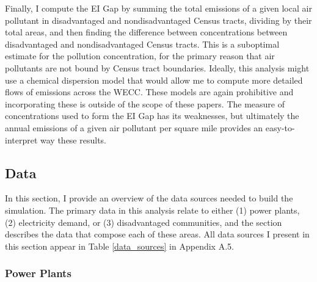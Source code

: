 Finally, I compute the EI Gap by summing the total emissions of a given local air pollutant in disadvantaged and nondisadvantaged Census tracts, dividing by their total areas, and then finding the difference between concentrations between disadvantaged and nondisadvantaged Census tracts. This is a suboptimal estimate for the pollution concentration, for the primary reason that air pollutants are not bound by Census tract boundaries. Ideally, this analysis might use a chemical dispersion model that would allow me to compute more detailed flows of emissions across the WECC. These models are again prohibitive and incorporating these is outside of the scope of these papers. The measure of concentrations used to form the EI Gap has its weaknesses, but ultimately the annual emissions of a given air pollutant per square mile provides an easy-to-interpret way these results. 


\subsection{Data}

In this section, I provide an overview of the data sources needed to build the simulation. The primary data in this analysis relate to either (1) power plants, (2) electricity demand, or (3) disadvantaged communities, and the section describes the data that compose each of these areas. All data sources I present in this section appear in Table \ref{data_sources} in Appendix A.5.

\subsubsection*{Power Plants}

